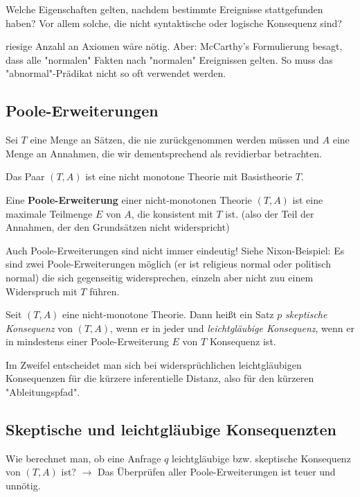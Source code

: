 \documentclass[runningheads,deutsch]{llncs}
\begin{document}
\begin{problem} Welche Eigenschaften gelten, nachdem bestimmte Ereignisse stattgefunden haben? Vor allem solche, die nicht syntaktische oder logische Konsequenz sind?
\end{problem}

\begin{problem} riesige Anzahl an Axiomen wäre nötig. Aber: McCarthy's Formulierung besagt, dass alle "normalen" Fakten nach "normalen" Ereignissen gelten. So muss das "abnormal"-Prädikat nicht so oft verwendet werden. %
\end{problem}

\subsection{Poole-Erweiterungen}

Sei $T$ eine Menge an Sätzen, die nie zurückgenommen werden müssen und $A$ eine Menge an Annahmen, die wir dementsprechend als revidierbar betrachten.

Das Paar $(T,A)$ ist eine nicht monotone Theorie mit Basistheorie $T$.

Eine \textbf{Poole-Erweiterung} einer nicht-monotonen Theorie $(T,A)$ ist eine maximale Teilmenge $E$ von $A$, die konsistent mit $T$ ist. (also der Teil der Annahmen, der den Grundsätzen nicht widerspricht)

Auch Poole-Erweiterungen sind nicht immer eindeutig! Siehe Nixon-Beispiel: Es sind zwei Poole-Erweiterungen möglich (er ist religieus normal oder politisch normal) die sich gegenseitig widersprechen, einzeln aber nicht zuu einem Widerspruch mit $T$ führen.

Seit $(T,A)$ eine nicht-monotone Theorie. Dann heißt ein Satz $p$ \textit{skeptische Konsequenz} von $(T,A)$, wenn er in jeder und \textit{leichtgläubige Konsequenz}, wenn er in mindestens einer Poole-Erweiterung $E$ von $T$ Konsequenz ist.

Im Zweifel entscheidet man sich bei widersprüchlichen leichtgläubigen Konsequenzen für die kürzere inferentielle Distanz, also für den kürzeren "Ableitungspfad".

\subsection{Skeptische und leichtgläubige Konsequenzten}

Wie berechnet man, ob eine Anfrage $q$ leichtgläubige bzw. skeptische Konsequenz von $(T,A)$ ist? $\rightarrow$ Das Überprüfen aller Poole-Erweiterungen ist teuer und unnötig.
\end{document}
